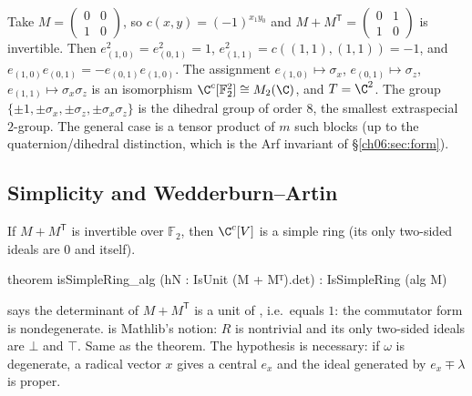 \begin{example}[$n=2$: the Pauli matrices]\label{ch06:ex:pauli}
Take $M=\begin{pmatrix}0&0\\1&0\end{pmatrix}$, so $c(x,y)=(-1)^{x_1y_0}$ and
$M+M^{\mathsf T}=\begin{pmatrix}0&1\\1&0\end{pmatrix}$ is invertible.  Then $e_{(1,0)}^2=e_{(0,1)}^2=1$,
$e_{(1,1)}^2=c((1,1),(1,1))=-1$, and $e_{(1,0)}e_{(0,1)}=-e_{(0,1)}e_{(1,0)}$.  The assignment
$e_{(1,0)}\mapsto\sigma_x$, $e_{(0,1)}\mapsto\sigma_z$, $e_{(1,1)}\mapsto\sigma_x\sigma_z$ is an
isomorphism $\C^c[\mathbb F_2^2]\cong M_2(\C)$, and $T=\C^2$.  The group $\{\pm1,\pm\sigma_x,
\pm\sigma_z,\pm\sigma_x\sigma_z\}$ is the dihedral group of order $8$, the smallest extraspecial
$2$-group.  The general case is a tensor product of $m$ such blocks (up to the
quaternion/dihedral distinction, which is the Arf invariant of \S\ref{ch06:sec:form}).
\end{example}

\subsection{Simplicity and Wedderburn--Artin}

\begin{theorem}\label{ch06:thm:simple}
If $M+M^{\mathsf T}$ is invertible over $\mathbb F_2$, then $\C^c[V]$ is a simple ring (its only
two-sided ideals are $0$ and itself).
\end{theorem}
\begin{leancode}
theorem isSimpleRing_alg (hN : IsUnit (M + Mᵀ).det) : IsSimpleRing (alg M)
\end{leancode}
\begin{dictionary}
 says the determinant of $M+M^{\mathsf T}$ is a unit of ,
i.e.\ equals $1$: the commutator form is nondegenerate.   is Mathlib's notion:
$R$ is nontrivial and its only two-sided ideals are $\bot$ and $\top$.  Same as the theorem.  The
hypothesis is necessary: if $\omega$ is degenerate, a radical vector $x$ gives a central $e_x$ and
the ideal generated by $e_x\mp\lambda$ is proper.
\end{dictionary}

